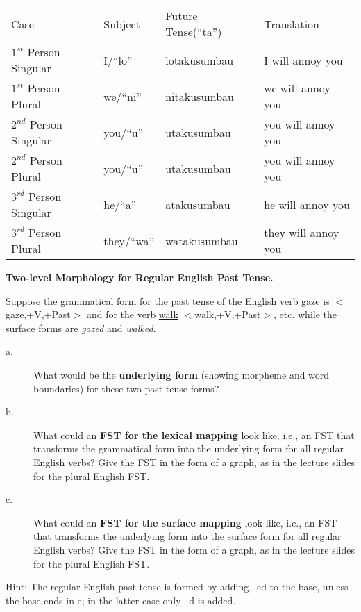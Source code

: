 \documentclass[11pt]{article}
\begin{document}
\begin{solution}
\begin{description}
\begin{tabular}{l l | l l}
 
Case & Subject & Future Tense(``ta'') & Translation \\
$1^{st}$ Person Singular & I/``lo'' & lotakusumbau & I will annoy you \\
$1^{st}$ Person Plural & we/``ni'' & nitakusumbau & we will annoy you \\
$2^{nd}$ Person Singular & you/``u'' & utakusumbau & you will annoy you \\
$2^{nd}$ Person Plural & you/``u'' & utakusumbau & you will annoy you \\
$3^{rd}$ Person Singular & he/``a'' & atakusumbau & he will annoy you  \\
$3^{rd}$ Person Plural & they/``wa'' & watakusumbau & they will annoy you \\ \hline
\end{tabular}

\end{description}

\end{solution}

\vspace*{0.5cm}

\begin{problem}{7}
\textbf{Two-level Morphology for Regular English Past Tense.}

Suppose the grammatical form for the past tense of the English verb \underline{gaze} is $<$gaze,+V,+Past$>$ and for the verb \underline{walk} $<$walk,+V,+Past$>$, etc. while the surface forms are \textit{gazed} and \textit{walked}.

\begin{description}
	\item[a.] What would be the \textbf{underlying form} (showing morpheme and word boundaries) for these two past tense forms?
	
	\item[b.] What could an \textbf{FST for the lexical mapping} look like, i.e., an FST that transforms the grammatical form into the underlying form for all regular English verbs? Give the FST in the form of a graph, as in the lecture slides for the plural English FST.
	
	\item[c.] What could an \textbf{FST for the surface mapping} look like, i.e., an FST that transforms the underlying form into the surface form for all regular English verbs? Give the FST in the form of a graph, as in the lecture slides for the plural English FST.
\end{description}

Hint: The regular English past tense is formed by adding –ed to the base, unless the base ends in e; in the latter case only –d is added.

\end{problem}
\end{document}
